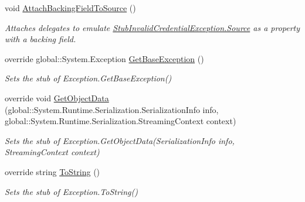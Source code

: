 \begin{DoxyCompactItemize}
void \hyperlink{class_system_1_1_security_1_1_authentication_1_1_fakes_1_1_stub_invalid_credential_exception_a6e109deff2d148f449845ac56d120496}{Attach\-Backing\-Field\-To\-Source} ()
\begin{DoxyCompactList}\small\item\em Attaches delegates to emulate \hyperlink{class_system_1_1_security_1_1_authentication_1_1_fakes_1_1_stub_invalid_credential_exception_ad54a9acf368e24239f20d4ab4dc6552a}{Stub\-Invalid\-Credential\-Exception.\-Source} as a property with a backing field.\end{DoxyCompactList}\item 
override global\-::\-System.\-Exception \hyperlink{class_system_1_1_security_1_1_authentication_1_1_fakes_1_1_stub_invalid_credential_exception_a51d075da8e6beaaf6e587940b565a7ee}{Get\-Base\-Exception} ()
\begin{DoxyCompactList}\small\item\em Sets the stub of Exception.\-Get\-Base\-Exception()\end{DoxyCompactList}\item 
override void \hyperlink{class_system_1_1_security_1_1_authentication_1_1_fakes_1_1_stub_invalid_credential_exception_abb4c395c2df8a96532ae13bcf6661076}{Get\-Object\-Data} (global\-::\-System.\-Runtime.\-Serialization.\-Serialization\-Info info, global\-::\-System.\-Runtime.\-Serialization.\-Streaming\-Context context)
\begin{DoxyCompactList}\small\item\em Sets the stub of Exception.\-Get\-Object\-Data(\-Serialization\-Info info, Streaming\-Context context)\end{DoxyCompactList}\item 
override string \hyperlink{class_system_1_1_security_1_1_authentication_1_1_fakes_1_1_stub_invalid_credential_exception_af85dcc113cbfa595ddd8a28aca76511e}{To\-String} ()
\begin{DoxyCompactList}\small\item\em Sets the stub of Exception.\-To\-String()\end{DoxyCompactList}\end{DoxyCompactItemize}
